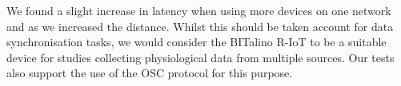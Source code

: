 We found a slight increase in latency when using more devices on one network and as we increased the distance. Whilst this should be taken account for data synchronisation tasks, we would consider the BITalino R-IoT to be a suitable device for studies collecting physiological data from multiple sources. Our tests also support the use of the OSC protocol for this purpose. 